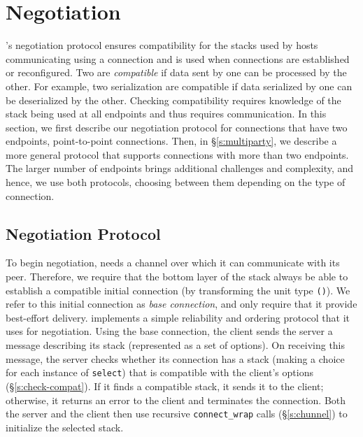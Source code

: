 \section{Negotiation}\label{s:negotiation}
\name's negotiation protocol ensures compatibility for the \tunnel stacks used by hosts communicating using a connection and is used when connections are established or reconfigured. 
Two \tunnels are \emph{compatible} if data sent by one can be processed by the other.
For example, two serialization \tunnels are compatible if data serialized by one can be deserialized by the other. 
Checking compatibility requires knowledge of the \tunnel stack being used at all endpoints and thus requires communication.
In this section, we first describe our negotiation protocol for connections that have two endpoints, \ie point-to-point connections.
Then, in \S\ref{s:multiparty}, we describe a more general protocol that supports connections with more than two endpoints. 
The larger number of endpoints brings additional challenges and complexity, and hence, we use both protocols, choosing between them depending on the type of connection.

\subsection{Negotiation Protocol}\label{s:neg-proto}
To begin negotiation, \name needs a channel over which it can communicate with its peer.
Therefore, we require that the bottom layer of the \tunnel stack always be able to establish a compatible initial connection (by transforming the unit type \texttt{()}). 
We refer to this initial connection as \emph{base connection}, and only require that it provide best-effort delivery.
\name implements a simple reliability and ordering protocol that it uses for negotiation.
Using the base connection, the client sends the server a message describing its \tunnel stack (represented as a set of \tunnel options). 
On receiving this message, the server checks whether its connection has a \tunnel stack (making a choice for each instance of \texttt{select}) that is compatible with the client's options (\S\ref{s:check-compat}). If it finds a compatible stack, it sends it to the client; otherwise, it returns an error to the client and terminates the connection.
Both the server and the client then use recursive \texttt{connect\_wrap} calls (\S\ref{s:chunnel}) to initialize the selected stack.

